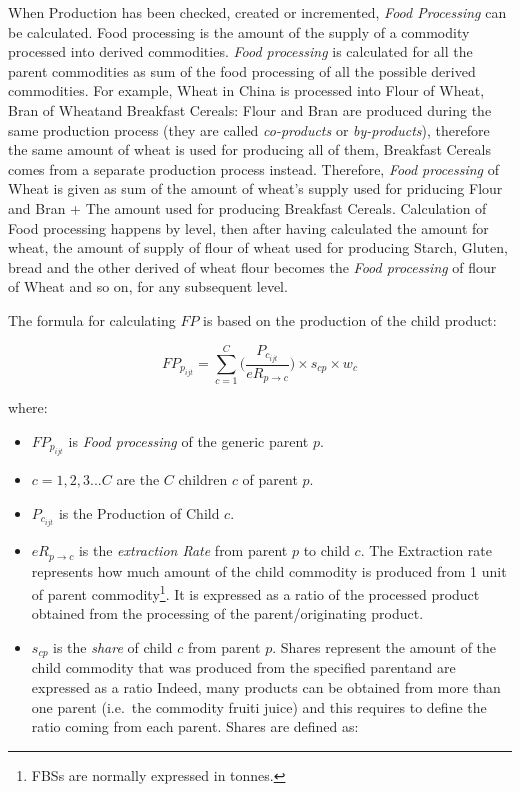\documentclass[]{article}
\providecommand{\tightlist}{%
  \setlength{\itemsep}{0pt}\setlength{\parskip}{0pt}}
\let\rmarkdownfootnote\footnote%
\def\footnote{\protect\rmarkdownfootnote}
\begin{document}
When Production has been checked, created or incremented, \emph{Food
Processing} can be calculated. Food processing is the amount of the
supply of a commodity processed into derived commodities. \emph{Food
processing} is calculated for all the parent commodities as sum of the
food processing of all the possible derived commodities. For example,
Wheat in China is processed into Flour of Wheat, Bran of Wheatand
Breakfast Cereals: Flour and Bran are produced during the same
production process (they are called \emph{co-products} or
\emph{by-products}), therefore the same amount of wheat is used for
producing all of them, Breakfast Cereals comes from a separate
production process instead. Therefore, \emph{Food processing} of Wheat
is given as sum of the amount of wheat's supply used for priducing Flour
and Bran + The amount used for producing Breakfast Cereals. Calculation
of Food processing happens by level, then after having calculated the
amount for wheat, the amount of supply of flour of wheat used for
producing Starch, Gluten, bread and the other derived of wheat flour
becomes the \emph{Food processing} of flour of Wheat and so on, for any
subsequent level.

The formula for calculating \(FP\) is based on the production of the
child product:

\begin{equation}
\label{eq:Food Processing}
FP_{p_{ijt}} = \sum \limits_{c=1}^C\biggl(\frac{P_{c_{ijt}}}{eR_{p\to c}}\biggr)\times s_{cp}\times w_{c}
\end{equation}

where:

\begin{itemize}
\tightlist
\item
  \(FP_{p_{ijt}}\) is \emph{Food processing} of the generic parent
  \(p\).
\item
  \(c = 1,2,3...C\) are the \(C\) children \(c\) of parent \(p\).
\item
  \(P_{c_{ijt}}\) is the Production of Child \(c\).
\item
  \(eR_{p\to c}\) is the \emph{extraction Rate} from parent \(p\) to
  child \(c\). The Extraction rate represents how much amount of the
  child commodity is produced from 1 unit of parent commodity\footnote{FBSs
    are normally expressed in tonnes.}. It is expressed as a ratio of
  the processed product obtained from the processing of the
  parent/originating product.
\item
  \(s_{cp}\) is the \emph{share} of child \(c\) from parent \(p\).
  Shares represent the amount of the child commodity that was produced
  from the specified parentand are expressed as a ratio Indeed, many
  products can be obtained from more than one parent (i.e.~the commodity
  fruiti juice) and this requires to define the ratio coming from each
  parent. Shares are defined as:
\end{itemize}
\end{document}
